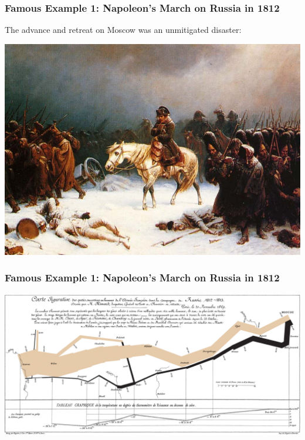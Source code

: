 \documentclass[handout]{beamer}
\begin{document}
\begin{frame}
\frametitle{Famous Example 1:  Napoleon's March on Russia in 1812}

The advance and retreat on Moscow was an unmitigated disaster:
\begin{center}
\includegraphics[height=0.6\textheight]{figure/retreat.jpg}
\end{center}


\end{frame}



\begin{frame}
\frametitle{Famous Example 1:  Napoleon's March on Russia in 1812}

\begin{center}
\includegraphics[width=\textwidth]{figure/Minard.png}
\end{center}

\end{frame}
\end{document}
